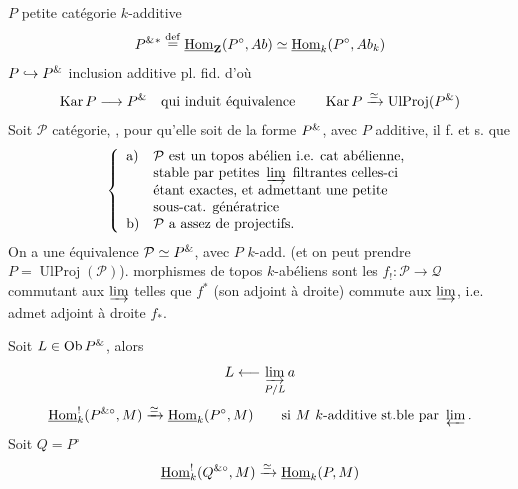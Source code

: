 $P$ petite catégorie $k$-additive
\[
P^{{\&}}{{}^{{*}}}\mathrel{\mathop=^{\rm def}}
\underline{\mathrm{Hom}}_{\mathbf Z}(P^\circ,Ab)\simeq
\underline{\mathrm{Hom}}_k(P^\circ,Ab_k)
\]
$P\hookrightarrow P^{{\&}}$ inclusion additive pl. fid. d'où
\[
\operatorname{Kar}P\longrightarrow P^{{\&}}
\quad\text{qui induit équivalence}\qquad
\operatorname{Kar}P\xrightarrow{\simeq}\operatorname{UlProj}(P^{{\&}})
\]
Soit $\mathcal P$ catégorie, , pour qu'elle soit
 de la forme $P^{{\&}}$, avec $P$ additive,
il f. et s. que
\[
\left\{\begin{array}{ll}
\text{a)}&\mathcal P\text{ est un {topos abélien} i.e. cat {abélienne},}\\
&\text{stable par petites }\varinjlim\text{ filtrantes celles-ci}\\
&\text{étant exactes, et admettant une petite}\\
&\text{sous-cat. génératrice}\\
\text{b)}&\mathcal P\text{ a assez de projectifs.}
\end{array}\right.
\]
 
On a une équivalence $\mathcal P\simeq P^{{\&}}$,
avec $P$ $k$-add.
(et on peut prendre $P=\operatorname{UlProj}(\mathcal P)$).
morphismes de topos $k$-abéliens 
sont les $f_!:\mathcal P\longrightarrow\mathcal Q$ commutant aux $\varinjlim$
telles que $f^*$  (son adjoint à droite) commute
aux $\varinjlim$, i.e. admet adjoint à droite $f_*$.

Soit $L\in\operatorname{Ob}P^{{\&}}$, alors
\[
L\longleftarrow\varinjlim_{P/L}a
\]
\[
\underline{\mathrm{Hom}}_k^!(P^{{\&}\circ},M)
\xrightarrow{\simeq}\underline{\mathrm{Hom}}_k(P^\circ,M)
\qquad\text{si }M\text{ $k$-additive st.{ble} par }\varprojlim.
\]
Soit $Q=P^\circ$
\[
\underline{\mathrm{Hom}}_k^!(Q^{{\&}\circ},M)
\xrightarrow{\simeq}\underline{\mathrm{Hom}}_k(P,M)
\]
